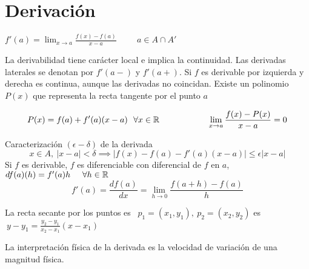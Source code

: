 \section{Derivación}
\begin{center}
$ f'(a) = \lim_{x\rightarrow a} \frac{f(x)-f(a)}{x-a} \hspace{1cm} a\in A\cap A' $
\end{center}

La derivabilidad tiene carácter local e implica la continuidad. 
Las derivadas laterales se denotan por $f'(a-)$ y $f'(a+)$.
Si $f$ es derivable por izquierda y derecha es continua, aunque las derivadas no coincidan. Existe un polinomio $P(x)$ que representa la recta tangente por el punto $a$

$$ P(x) = f(a) + f'(a)(x-a) \ \ \forall x\in\mathbb{R} \hspace{2cm}
\lim_{x\rightarrow a} \frac{f(x)-P(x)}{x-a} = 0$$

Caracterización $(\epsilon-\delta)$ de la derivada
$$ x\in A, \ |x-a|<\delta \implies |f(x)-f(a)-f'(a)(x-a)|\leq \epsilon |x-a| $$
Si $f$ es derivable, $f$ es diferenciable con diferencial de $f$ en $a$,
$ df(a)(h) = f'(a)h \hspace{0.5cm} \forall h\in\mathbb{R} $
$$ f'(a) = \frac{df(a)}{dx} = \lim_{h\rightarrow 0}\frac{f(a+h)-f(a)}{h} $$

La recta secante por los puntos es \  $p_1 = (x_1, y_1), \ p_2 = (x_2, y_2)$ es $\ y-y_1 = \frac{y_2-y_1}{x_2-x_1}(x-x_1)$

La interpretación física de la derivada es la velocidad de variación de una magnitud física.

